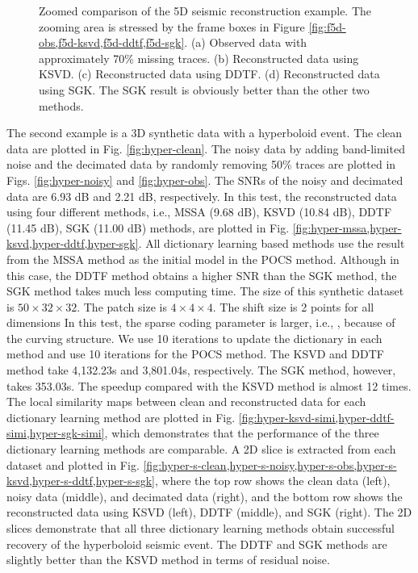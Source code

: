 \begin{figure}[ht!]
{  \label{fig:z-sgk}}
\caption{Zoomed comparison of the 5D seismic reconstruction example. The zooming area is stressed by the frame boxes in Figure \ref{fig:f5d-obs,f5d-ksvd,f5d-ddtf,f5d-sgk}. (a) Observed data with approximately 70\% missing traces. (b) Reconstructed data using KSVD. (c) Reconstructed data using DDTF. (d) Reconstructed data using SGK. The SGK result is obviously better than the other two methods.}
\label{fig:z-obs,z-ksvd,z-ddtf,z-sgk}
\end{figure}

The second example is a 3D synthetic data with a hyperboloid event. The clean data are plotted in Fig. \ref{fig:hyper-clean}. The noisy data by adding band-limited noise and the decimated data by randomly removing 50\% traces are plotted in Figs. \ref{fig:hyper-noisy} and \ref{fig:hyper-obs}. The SNRs of the noisy and decimated data are 6.93 dB and 2.21 dB, respectively. In this test, the reconstructed data using four different methods, i.e., MSSA (9.68 dB), KSVD (10.84 dB), DDTF (11.45 dB), SGK (11.00 dB) methods, are plotted in Fig. \ref{fig:hyper-mssa,hyper-ksvd,hyper-ddtf,hyper-sgk}.  All dictionary learning based methods use the result from the MSSA method as the initial model in the POCS method. Although in this case, the DDTF method obtains a higher SNR than the SGK method, the SGK method takes much less computing time. The size of this synthetic dataset is $50\times 32\times 32$. The patch size is $4\times 4 \times 4$. The shift size is 2 points for all dimensions  In this test, the sparse coding parameter is larger, i.e., , because of the curving structure. We use 10 iterations to update the dictionary in each method and use 10 iterations for the POCS method. The KSVD and DDTF method take 4,132.23s and 3,801.04s, respectively. The SGK method, however, takes 353.03s. The speedup compared with the KSVD method is almost 12 times. The local similarity maps between clean and reconstructed data for each dictionary learning method are plotted in Fig. \ref{fig:hyper-ksvd-simi,hyper-ddtf-simi,hyper-sgk-simi}, which demonstrates that the performance of the three dictionary learning methods are comparable. A 2D slice is extracted from each dataset and plotted in Fig. \ref{fig:hyper-s-clean,hyper-s-noisy,hyper-s-obs,hyper-s-ksvd,hyper-s-ddtf,hyper-s-sgk}, where the top row shows the clean data (left), noisy data (middle), and decimated data (right), and the bottom row shows the reconstructed data using KSVD (left), DDTF (middle), and SGK (right). The 2D slices demonstrate that all three dictionary learning methods obtain successful recovery of the hyperboloid seismic event. The DDTF and SGK methods are slightly better than the KSVD method in terms of residual noise. 

